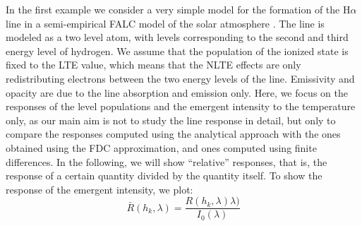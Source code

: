 \documentclass[referee]{aa}
\begin{document}
In the first example we consider a very simple model for the formation of the H$\alpha$ line in a semi-empirical FALC model of the solar atmosphere \citep{FALC}. The line is modeled as a two level atom, with levels corresponding to the second and third energy level of hydrogen. We assume that the population of the ionized state is fixed to the LTE value, which means that the NLTE effects are only redistributing electrons between the two energy levels of the line. Emissivity and opacity are due to the line absorption and emission only. Here, we focus on the responses of the level populations and the emergent intensity to the temperature only, as our main aim is not to study the line response in detail, but only to compare the responses computed using the analytical approach with the ones obtained using the FDC approximation, and ones computed using finite differences. In the following, we will show ``relative'' responses, that is, the response of a certain quantity divided by the quantity itself. To show the response of the emergent intensity, we plot:
\begin{equation}
 \bar{R}(h_k,\lambda) = \frac{R(h_k,\lambda)\lambda)}{I_0(\lambda)}
\end{equation}
\end{document}
